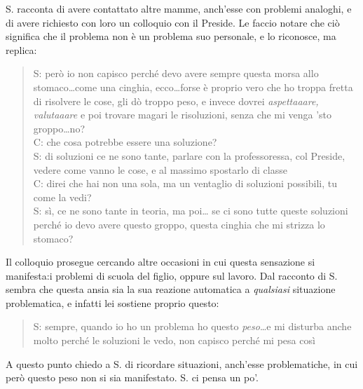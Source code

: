 \noindent S. racconta di avere contattato altre mamme, anch'esse con problemi analoghi,  e di avere richiesto con loro un colloquio con il Preside. Le faccio notare che ciò significa che il problema non è un problema suo personale, e lo riconosce, ma replica:

\begin{verse}
S: però io non capisco perché devo avere sempre questa morsa allo stomaco\ldots{}come una cinghia, ecco\ldots{}forse è proprio vero che ho troppa fretta di risolvere le cose, gli dò troppo peso, e invece dovrei \emph{aspettaaare, valutaaare} e poi trovare magari le risoluzioni, senza che mi venga 'sto groppo\ldots{}no?\\
C: che cosa potrebbe essere una soluzione?\\
S: di soluzioni ce ne sono tante, parlare con la professoressa, col Preside, vedere come vanno le cose, e al massimo spostarlo di classe\\
C: direi che hai non una sola, ma un ventaglio di soluzioni possibili, tu come la vedi?\label{ventaglio}\\
S: sì, ce ne sono tante in teoria, ma poi\ldots{} se ci sono tutte queste soluzioni perché io devo avere questo groppo, questa cinghia che mi strizza lo stomaco?\\ 
\end{verse}

\noindent Il colloquio prosegue cercando altre occasioni in cui questa sensazione si manifesta:i problemi di scuola del figlio, oppure sul lavoro. Dal racconto di S. sembra che questa ansia sia la sua reazione automatica a \emph{qualsiasi} situazione problematica, e infatti lei sostiene proprio questo:
\begin{verse}
S: sempre, quando io ho un problema ho questo \emph{peso}\ldots{}e mi disturba anche molto perché le soluzioni le vedo, non capisco perché mi pesa così
\end{verse}

\noindent A questo punto chiedo a S. di ricordare situazioni, anch'esse problematiche, in cui però questo peso non si sia manifestato. S. ci pensa un po'.


